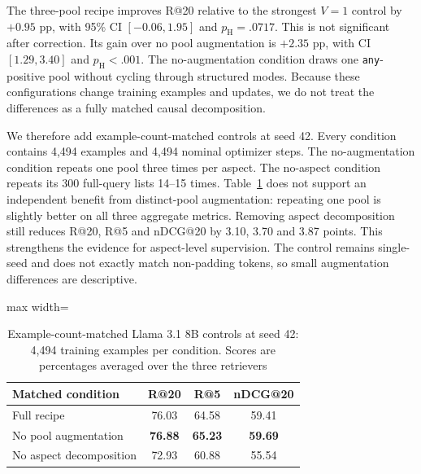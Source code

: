 \documentclass[pdflatex,sn-basic,Numbered]{sn-jnl}%
\theoremstyle{thmstyleone}%
\theoremstyle{thmstyletwo}%
\theoremstyle{thmstylethree}%
\begin{document}
The three-pool recipe improves R@20 relative to the strongest $V=1$ control by
$+0.95$ pp, with 95\% CI $[-0.06,1.95]$ and $p_{\mathrm{H}}=.0717$.
This is not significant after correction. Its gain over no pool augmentation
is $+2.35$ pp, with CI $[1.29,3.40]$ and $p_{\mathrm{H}}<.001$.
The no-augmentation condition draws one \texttt{any}-positive pool without
cycling through structured modes. Because these configurations change training
examples and updates, we do not treat the differences as a fully matched causal
decomposition.

We therefore add example-count-matched controls at seed 42. Every condition
contains 4,494 examples and 4,494 nominal optimizer steps. The no-augmentation
condition repeats one pool three times per aspect. The no-aspect condition
repeats its 300 full-query lists 14--15 times. Table~\ref{tab:matched-main-ablation}
does not support an independent benefit from distinct-pool augmentation:
repeating one pool is slightly better on all three aggregate metrics. Removing
aspect decomposition still reduces R@20, R@5 and nDCG@20 by 3.10, 3.70 and
3.87 points. This strengthens the evidence for aspect-level supervision. The
control remains single-seed and does not exactly match non-padding tokens, so
small augmentation differences are descriptive.

\begin{table}[ht]


\centering
\footnotesize
\setlength{\tabcolsep}{3.2pt}
\renewcommand{\arraystretch}{1.08}
\begin{adjustbox}{max width=\linewidth}
\begin{tabular}{l c c c}
\hline
Matched condition & R@20 & R@5 & nDCG@20 \\
\hline
Full recipe & 76.03 & 64.58 & 59.41 \\
No pool augmentation & \textbf{76.88} & \textbf{65.23} & \textbf{59.69} \\
No aspect decomposition & 72.93 & 60.88 & 55.54 \\
\hline
\end{tabular}
\end{adjustbox}



\caption{Example-count-matched Llama 3.1 8B controls at seed 42: 4,494 training examples per condition. Scores are percentages averaged over the three retrievers}
\label{tab:matched-main-ablation}
\end{table}
\end{document}
